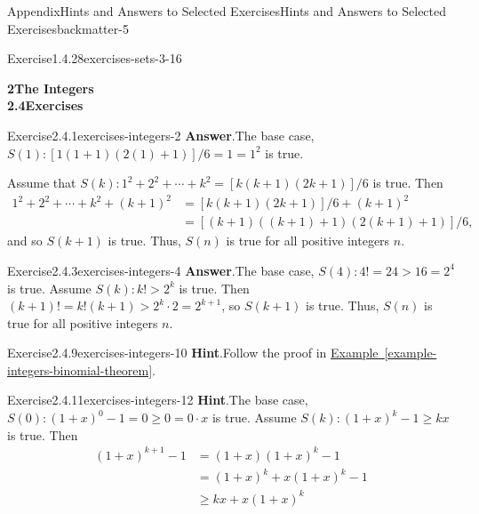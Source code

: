 \documentclass[oneside,10pt,]{book}
\newcommand{\blocktitlefont}{\relax}
\newcommand{\xreffont}{\relax}
\numberwithin{equation}{section}
\newcommand{\gt}{>}
\begin{document}
\begin{solutions-chapter}{Appendix}{Hints and Answers to Selected Exercises}{}{Hints and Answers to Selected Exercises}{}{}{backmatter-5}
\begin{divisionsolution}{Exercise}{1.4.28}{}{exercises-sets-3-16}
\end{divisionsolution}%
\par\medskip\noindent
\par\medskip
\noindent\textbf{\Large{}2\space\textperiodcentered\space{}The Integers\\
2.4\space\textperiodcentered\space{}Exercises}
\begin{divisionsolution}{Exercise}{2.4.1}{}{exercises-integers-2}%
\noindent\textbf{\blocktitlefont Answer}.\hypertarget{exercises-integers-2-2-back}{}\quad{}The base case, \(S(1): [1(1 + 1)(2(1) + 1)]/6 = 1 = 1^2\) is true.%
\par
Assume that \(S(k): 1^2 + 2^2 + \cdots + k^2 = [k(k + 1)(2k + 1)]/6\) is true. Then%
\begin{align*}
1^2 + 2^2 + \cdots + k^2 + (k + 1)^2 & = [k(k + 1)(2k + 1)]/6 + (k + 1)^2\\
& = [(k + 1)((k + 1) + 1)(2(k + 1) + 1)]/6,
\end{align*}
and so \(S(k + 1)\) is true. Thus, \(S(n)\) is true for all positive integers \(n\).%
\end{divisionsolution}%
\begin{divisionsolution}{Exercise}{2.4.3}{}{exercises-integers-4}%
\noindent\textbf{\blocktitlefont Answer}.\hypertarget{exercises-integers-4-2-back}{}\quad{}The base case, \(S(4): 4! = 24 \gt 16 =2^4\) is true. Assume \(S(k): k! \gt 2^k\) is true. Then \((k + 1)! = k! (k + 1) \gt 2^k \cdot 2 = 2^{k + 1}\), so \(S(k + 1)\) is true. Thus, \(S(n)\) is true for all positive integers \(n\).%
\end{divisionsolution}%
\begin{divisionsolution}{Exercise}{2.4.9}{}{exercises-integers-10}%
\noindent\textbf{\blocktitlefont Hint}.\hypertarget{exercises-integers-10-2-back}{}\quad{}Follow the proof in \hyperref[example-integers-binomial-theorem]{Example~{\xreffont\ref{example-integers-binomial-theorem}}}.%
\end{divisionsolution}%
\begin{divisionsolution}{Exercise}{2.4.11}{}{exercises-integers-12}%
\noindent\textbf{\blocktitlefont Hint}.\hypertarget{exercises-integers-12-2-back}{}\quad{}The base case, \(S(0): (1 + x)^0 - 1 = 0 \geq 0 = 0 \cdot x\) is true. Assume \(S(k): (1 + x)^k -1 \geq kx\) is true. Then%
\begin{align*}
(1 + x)^{k + 1} - 1 & = (1 + x)(1 + x)^k -1\\
& = (1 + x)^k + x(1 + x)^k - 1\\
& \geq kx + x(1 + x)^k\\

\end{align*}
\end{divisionsolution}
\end{solutions-chapter}
\end{document}
